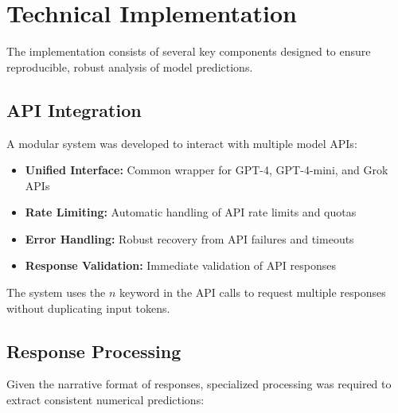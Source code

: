 \section{Technical Implementation}\label{sec:technical}

The implementation consists of several key components designed to ensure reproducible, robust analysis of model predictions.

\subsection{API Integration}

A modular system was developed to interact with multiple model APIs:

\begin{itemize}
    \item \textbf{Unified Interface:} Common wrapper for GPT-4, GPT-4-mini, and Grok APIs
    \item \textbf{Rate Limiting:} Automatic handling of API rate limits and quotas
    \item \textbf{Error Handling:} Robust recovery from API failures and timeouts
    \item \textbf{Response Validation:} Immediate validation of API responses
\end{itemize}

The system uses the $n$ keyword in the API calls to request multiple responses without duplicating input tokens.

\subsection{Response Processing}

Given the narrative format of responses, specialized processing was required to extract consistent numerical predictions:

